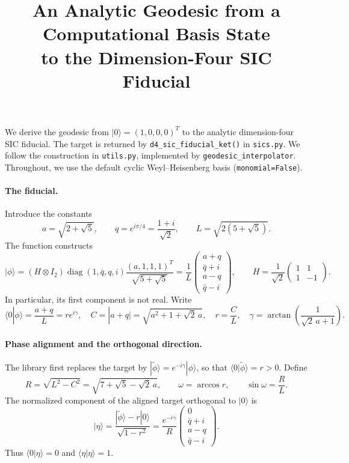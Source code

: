 \documentclass[11pt]{article}
\title{An Analytic Geodesic from a Computational Basis State\\to the Dimension-Four SIC Fiducial}
\author{}
\date{}
\begin{document}
\maketitle

We derive the geodesic from $|0\rangle=(1,0,0,0)^T$ to the analytic
dimension-four SIC fiducial. The target is returned by
\texttt{d4\_sic\_fiducial\_ket()} in \texttt{sics.py}.
We follow the construction in \texttt{utils.py}, implemented by
\texttt{geodesic\_interpolator}.
Throughout, we use the default cyclic Weyl--Heisenberg basis
(\texttt{monomial=False}).

\paragraph{The fiducial.}
Introduce the constants
\begin{equation}
 a=\sqrt{2+\sqrt5},\qquad q=e^{i\pi/4}=\frac{1+i}{\sqrt2},
 \qquad L=\sqrt{2(5+\sqrt5)}.
\end{equation}
The function constructs
\begin{equation}
 |\phi\rangle
 =(H\otimes I_2)\operatorname{diag}(1,\bar q,q,i)
 \frac{(a,1,1,1)^T}{\sqrt{5+\sqrt5}}
 =\frac1L
 \begin{pmatrix}
 a+q\\ \bar q+i\\ a-q\\ \bar q-i
 \end{pmatrix},
 \qquad H=\frac1{\sqrt2}\begin{pmatrix}1&1\\1&-1\end{pmatrix}.
\end{equation}
In particular, its first component is not real. Write
\begin{equation}
 \langle0|\phi\rangle=\frac{a+q}{L}=r e^{i\gamma},
 \quad
 C=|a+q|=\sqrt{a^2+1+\sqrt2\,a},\quad r=\frac CL,
 \quad
 \gamma=\arctan\!\left(\frac1{\sqrt2\,a+1}\right).
\end{equation}

\paragraph{Phase alignment and the orthogonal direction.}
The library first replaces the target by
$|\widetilde\phi\rangle=e^{-i\gamma}|\phi\rangle$, so that
$\langle0|\widetilde\phi\rangle=r>0$. Define
\begin{equation}
 R=\sqrt{L^2-C^2}=\sqrt{7+\sqrt5-\sqrt2\,a},
 \qquad \omega=\arccos r,
 \qquad \sin\omega=\frac RL.
\end{equation}
The normalized component of the aligned target orthogonal to $|0\rangle$ is
\begin{equation}
 |\eta\rangle
 =\frac{|\widetilde\phi\rangle-r|0\rangle}{\sqrt{1-r^2}}
 =\frac{e^{-i\gamma}}R
 \begin{pmatrix}0\\\bar q+i\\a-q\\\bar q-i\end{pmatrix}.
\end{equation}
Thus $\langle0|\eta\rangle=0$ and $\langle\eta|\eta\rangle=1$.
\end{document}
